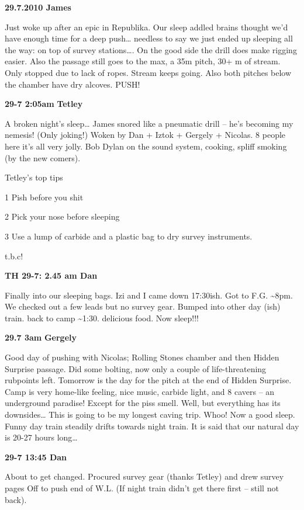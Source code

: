 \textbf{29.7.2010 James}

Just woke up after an epic in Republika. Our sleep addled brains thought
we'd have enough time for a deep push\ldots{} needless to say we just
ended up sleeping all the way: on top of survey stations\ldots{}. On the
good side the drill does make rigging easier. Also the passage still
goes to the max, a 35m pitch, 30+ m of stream. Only stopped due to lack
of ropes. Stream keeps going. Also both pitches below the chamber have
dry alcoves. PUSH!

\textbf{29-7 2:05am} \textbf{Tetley}

A broken night's sleep\ldots{} James snored like a pneumatic drill --
he's becoming my nemesis! (Only joking!) Woken by Dan + Iztok + Gergely
+ Nicolas. 8 people here it's all very jolly. Bob Dylan on the sound
system, cooking, spliff smoking (by the new comers).

Tetley's top tips

1 Pish before you shit

2 Pick your nose before sleeping

3 Use a lump of carbide and a plastic bag to dry survey instruments.

t.b.c!

\textbf{TH 29-7: 2.45 am Dan}

Finally into our sleeping bags. Izi and I came down 17:30ish. Got to
F.G. \textasciitilde{}8pm. We checked out a few leads but no survey
gear. Bumped into other day (ish) train. back to camp
\textasciitilde{}1:30. delicious food. Now sleep!!!

\textbf{29.7 3am} \textbf{Gergely}

Good day of pushing with Nicolas; Rolling Stones chamber and then Hidden
Surprise passage. Did some bolting, now only a couple of
life-threatening rubpoints left. Tomorrow is the day for the pitch at
the end of Hidden Surprise. Camp is very home-like feeling, nice music,
carbide light, and 8 cavers -- an underground paradise! Except for the
piss smell. Well, but everything has its downsides\ldots{} This is going
to be my longest caving trip. Whoo! Now a good sleep. Funny day train
steadily drifts towards night train. It is said that our natural day is
20-27 hours long\ldots{}

\textbf{29-7 13:45 Dan}

About to get changed. Procured survey gear (thanks Tetley) and drew
survey pages Off to push end of W.L. (If night train didn't get there
first -- still not back).

